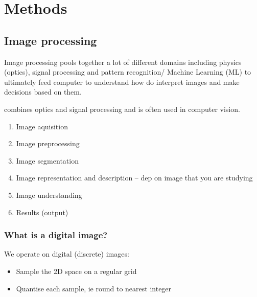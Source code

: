
\chapter{Methods} %

\label{methods} %

%


\section{Image processing}

Image processing pools together a lot of different domains including physics (optics), signal processing and pattern recognition/ Machine Learning (ML) to ultimately feed computer to understand how do interpret images and make decisions based on them. 

combines optics and signal processing and is often used in computer vision.
\begin{enumerate}
	\item Image aquisition
	\item Image preprocessing 
	\item Image segmentation
	\item Image representation and description -- dep on image that you are studying
	\item Image understanding
	\item Results (output)
\end{enumerate}

\subsection{What is a digital image?}

We operate on digital (discrete) images:
\begin{itemize}
	\item Sample the 2D space on a regular grid
	\item Quantise each sample, ie round to nearest integer
\end{itemize}

